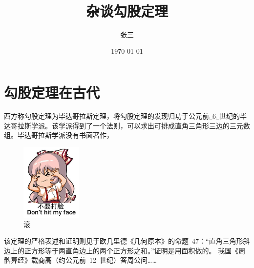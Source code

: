 \documentclass[UTF8]{ctexart}
\title{杂谈勾股定理}
\author{张三}
\date{\today}
\begin{document}
\maketitle
\tableofcontents
\section{勾股定理在古代}
西方称勾股定理为毕达哥拉斯定理，将勾股定理的发现归功于公元前␣6␣世纪的毕达哥拉斯学派。该学派得到了一个法则，可以求出可排成直角三角形三边的三元数组。毕达哥拉斯学派没有书面著作，\cite{Kline}
\begin{figure}[h]
    \centering
    \includegraphics[width=3cm]{不要打脸.jpg}
    \caption{滚}
\end{figure}
该定理的严格表述和证明则见于欧几里德《几何原本》的命题\ 47：“直角三角形斜边上的正方形等于两直角边上的两个正方形之和。”证明是用面积做的。
我国《周髀算经》载商高（约公元前\ 12\ 世纪）答周公问…… \cite{quanjing}


\end{document}
